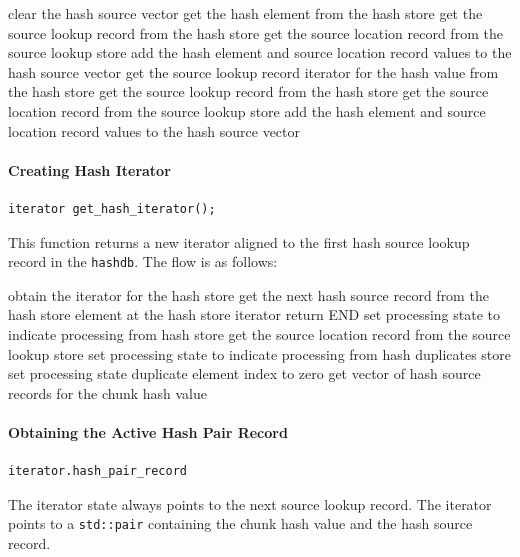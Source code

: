 \documentclass[10pt,twoside]{article}
\newcommand{\hdb}{\texttt{hashdb}\xspace}
\begin{document}
\begin{algorithmic}
\STATE clear the hash source vector
  \RETURN \FALSE
\ENDIF
\STATE get the hash element from the hash store
  \STATE get the source lookup record from the hash store
  \STATE get the source location record from the source lookup store
  \STATE add the hash element and source location record values to the hash source vector
  \RETURN \TRUE
\ELSE
  \STATE get the source lookup record iterator for the hash value from the hash store
    \STATE get the source lookup record from the hash store
    \STATE get the source location record from the source lookup store
    \STATE add the hash element and source location record values to the hash source vector
  \ENDFOR
  \RETURN \TRUE
\ENDIF
\end{algorithmic}

\paragraph{Creating Hash Iterator}
\begin{small}
\begin{verbatim}
iterator get_hash_iterator();
\end{verbatim}
\end{small}
This function returns a new iterator aligned to the first hash source lookup record in the \hdb.
The flow is as follows:

\begin{algorithmic}
\STATE obtain the iterator for the hash store
\STATE get the next hash source record from the hash store element at the hash store iterator
  \STATE return END
\ELSE
    \STATE set processing state to indicate processing from hash store
    \STATE get the source location record from the source lookup store
  \ELSE
    \STATE set processing state to indicate processing from hash duplicates store
    \STATE set processing state duplicate element index to zero
    \STATE get vector of hash source records for the chunk hash value
  \ENDIF
\ENDIF
\end{algorithmic}

\paragraph{Obtaining the Active Hash Pair Record}
\begin{small}
\begin{verbatim}
iterator.hash_pair_record
\end{verbatim}
\end{small}
The iterator state always points to the next source lookup record.
The iterator points to a \texttt{std::pair}
containing the chunk hash value and the hash source record.
\end{document}
